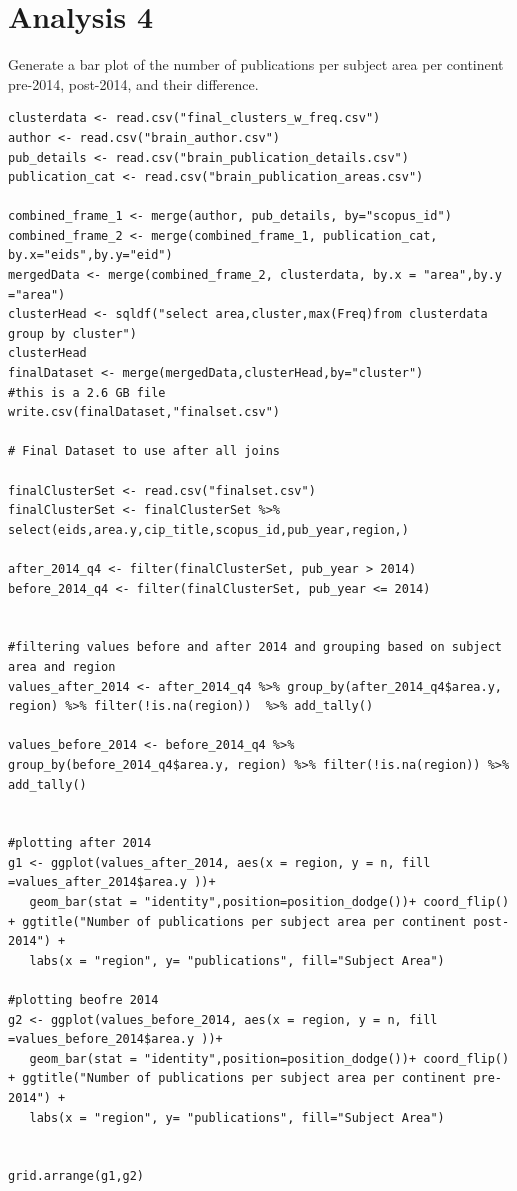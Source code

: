\documentclass[a4paper,11pt]{article}
\theoremstyle{mytheor}
\begin{document}


\section*{Analysis 4}
Generate a bar plot of the number of publications per subject area per continent pre-2014, post-2014, and their difference.

\begin{lstlisting}[label={list:first},caption=Generating bar plot of the number of publications per subject]
clusterdata <- read.csv("final_clusters_w_freq.csv")
author <- read.csv("brain_author.csv")
pub_details <- read.csv("brain_publication_details.csv")
publication_cat <- read.csv("brain_publication_areas.csv")

combined_frame_1 <- merge(author, pub_details, by="scopus_id")
combined_frame_2 <- merge(combined_frame_1, publication_cat, by.x="eids",by.y="eid")
mergedData <- merge(combined_frame_2, clusterdata, by.x = "area",by.y ="area")
clusterHead <- sqldf("select area,cluster,max(Freq)from clusterdata group by cluster")
clusterHead
finalDataset <- merge(mergedData,clusterHead,by="cluster")
#this is a 2.6 GB file 
write.csv(finalDataset,"finalset.csv")

# Final Dataset to use after all joins

finalClusterSet <- read.csv("finalset.csv")
finalClusterSet <- finalClusterSet %>% select(eids,area.y,cip_title,scopus_id,pub_year,region,)

after_2014_q4 <- filter(finalClusterSet, pub_year > 2014)
before_2014_q4 <- filter(finalClusterSet, pub_year <= 2014)


#filtering values before and after 2014 and grouping based on subject area and region 
values_after_2014 <- after_2014_q4 %>% group_by(after_2014_q4$area.y, region) %>% filter(!is.na(region))  %>% add_tally()

values_before_2014 <- before_2014_q4 %>% group_by(before_2014_q4$area.y, region) %>% filter(!is.na(region)) %>% add_tally()


#plotting after 2014
g1 <- ggplot(values_after_2014, aes(x = region, y = n, fill =values_after_2014$area.y ))+
   geom_bar(stat = "identity",position=position_dodge())+ coord_flip() + ggtitle("Number of publications per subject area per continent post-2014") +
   labs(x = "region", y= "publications", fill="Subject Area")

#plotting beofre 2014
g2 <- ggplot(values_before_2014, aes(x = region, y = n, fill =values_before_2014$area.y ))+
   geom_bar(stat = "identity",position=position_dodge())+ coord_flip() + ggtitle("Number of publications per subject area per continent pre-2014") +
   labs(x = "region", y= "publications", fill="Subject Area")


grid.arrange(g1,g2)
\end{lstlisting}
\end{document}
